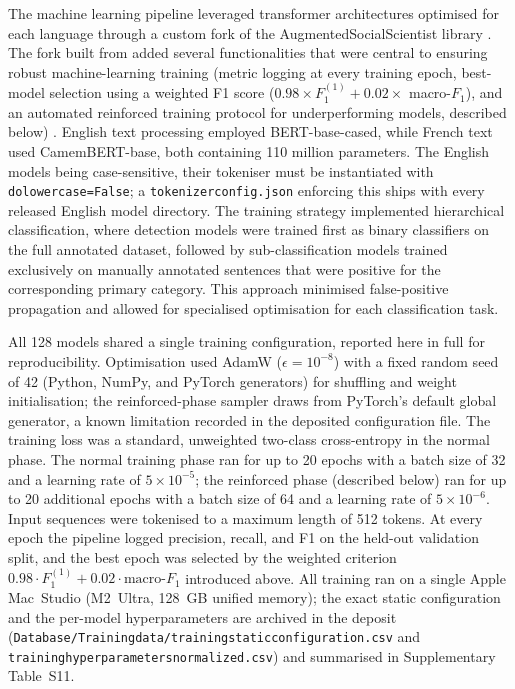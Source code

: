 \documentclass[12pt]{article}
\renewcommand\_{\texttt{\detokenize{_}\allowbreak}}
\begin{document}
The machine learning pipeline leveraged transformer architectures optimised for each language through a custom fork of the AugmentedSocialScientist library \autocite{do_augmented_2022, lemor_antoinelemoraugmentedsocialscientistfork_2025}. The fork built from \textcite{do_augmented_2022} added several functionalities that were central to ensuring robust machine-learning training (metric logging at every training epoch, best-model selection using a weighted F1 score ($0.98 \times F_1^{(1)} + 0.02 \times$ macro-$F_1$), and an automated reinforced training protocol for underperforming models, described below) \autocite{lemor_antoinelemoraugmentedsocialscientistfork_2025}. English text processing employed BERT-base-cased, while French text used CamemBERT-base, both containing 110 million parameters. The English models being case-sensitive, their tokeniser must be instantiated with \texttt{do\_lower\_case=False}; a \texttt{tokenizer\_config.json} enforcing this ships with every released English model directory. The training strategy implemented hierarchical classification, where detection models were trained first as binary classifiers on the full annotated dataset, followed by sub-classification models trained exclusively on manually annotated sentences that were positive for the corresponding primary category. This approach minimised false-positive propagation and allowed for specialised optimisation for each classification task.

All 128 models shared a single training configuration, reported here in full for reproducibility. Optimisation used AdamW ($\epsilon = 10^{-8}$) with a fixed random seed of 42 (Python, NumPy, and PyTorch generators) for shuffling and weight initialisation; the reinforced-phase sampler draws from PyTorch's default global generator, a known limitation recorded in the deposited configuration file. The training loss was a standard, unweighted two-class cross-entropy in the normal phase. The normal training phase ran for up to 20 epochs with a batch size of 32 and a learning rate of $5 \times 10^{-5}$; the reinforced phase (described below) ran for up to 20 additional epochs with a batch size of 64 and a learning rate of $5 \times 10^{-6}$. Input sequences were tokenised to a maximum length of 512 tokens. At every epoch the pipeline logged precision, recall, and F1 on the held-out validation split, and the best epoch was selected by the weighted criterion $0.98 \cdot F_1^{(1)} + 0.02 \cdot \text{macro-}F_1$ introduced above. All training ran on a single Apple Mac~Studio (M2~Ultra, 128~GB unified memory); the exact static configuration and the per-model hyperparameters are archived in the deposit (\texttt{Database/Training\_data/training\_static\_configuration.csv} and \texttt{training\_hyperparameters\_normalized.csv}) and summarised in Supplementary Table~S11.
\end{document}
